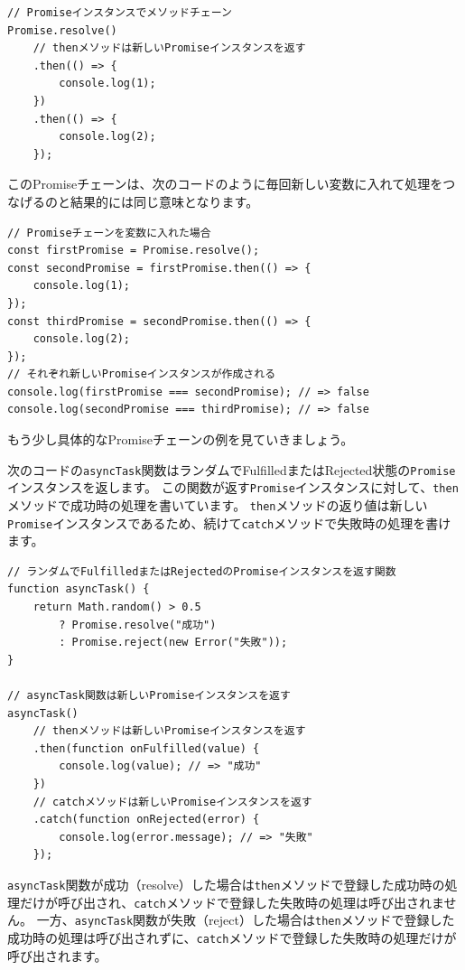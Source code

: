 \begin{lstlisting}
// Promiseインスタンスでメソッドチェーン
Promise.resolve()
    // thenメソッドは新しいPromiseインスタンスを返す
    .then(() => {
        console.log(1);
    })
    .then(() => {
        console.log(2);
    });
\end{lstlisting}
\vspace{-1mm}
このPromiseチェーンは、次のコードのように毎回新しい変数に入れて処理をつなげるのと結果的には同じ意味となります。
\vspace{-1mm}
\begin{lstlisting}
// Promiseチェーンを変数に入れた場合
const firstPromise = Promise.resolve();
const secondPromise = firstPromise.then(() => {
    console.log(1);
});
const thirdPromise = secondPromise.then(() => {
    console.log(2);
});
// それぞれ新しいPromiseインスタンスが作成される
console.log(firstPromise === secondPromise); // => false
console.log(secondPromise === thirdPromise); // => false
\end{lstlisting}
\vspace{-1mm}
もう少し具体的なPromiseチェーンの例を見ていきましょう。

次のコードの\texttt{asyncTask}関数はランダムでFulfilledまたはRejected状態の\texttt{Promise}インスタンスを返します。
この関数が返す\texttt{Promise}インスタンスに対して、\texttt{then}メソッドで成功時の処理を書いています。
\texttt{then}メソッドの返り値は新しい\texttt{Promise}インスタンスであるため、続けて\texttt{catch}メソッドで失敗時の処理を書けます。
\vspace{-1mm}
\enlargethispage{\baselineskip}\begin{lstlisting}
// ランダムでFulfilledまたはRejectedのPromiseインスタンスを返す関数
function asyncTask() {
    return Math.random() > 0.5 
        ? Promise.resolve("成功")
        : Promise.reject(new Error("失敗"));
}

// asyncTask関数は新しいPromiseインスタンスを返す
asyncTask()
    // thenメソッドは新しいPromiseインスタンスを返す
    .then(function onFulfilled(value) {　
        console.log(value); // => "成功"
    })
    // catchメソッドは新しいPromiseインスタンスを返す
    .catch(function onRejected(error) {
        console.log(error.message); // => "失敗"
    });
\end{lstlisting}

\texttt{asyncTask}関数が成功（resolve）した場合は\texttt{then}メソッドで登録した成功時の処理だけが呼び出され、\texttt{catch}メソッドで登録した失敗時の処理は呼び出されません。
一方、\texttt{asyncTask}関数が失敗（reject）した場合は\texttt{then}メソッドで登録した成功時の処理は呼び出されずに、\texttt{catch}メソッドで登録した失敗時の処理だけが呼び出されます。

